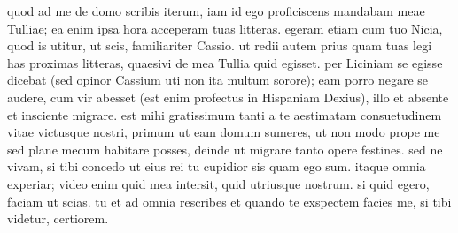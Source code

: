  quod ad me de domo scribis iterum, iam id ego proficiscens mandabam meae Tulliae; ea enim ipsa hora acceperam tuas litteras. egeram etiam cum tuo Nicia, quod is utitur, ut scis, familiariter Cassio. ut redii autem prius quam tuas legi has proximas litteras, quaesivi de mea Tullia quid egisset. per Liciniam se egisse dicebat (sed opinor Cassium uti non ita multum sorore); eam porro negare se audere, cum vir abesset (est enim profectus in Hispaniam Dexius), illo et absente et insciente migrare. est mihi gratissimum tanti a te aestimatam consuetudinem vitae victusque nostri, primum ut eam domum sumeres, ut non modo prope me sed plane mecum habitare posses, deinde ut migrare tanto opere festines. sed ne vivam, si tibi concedo ut eius rei tu cupidior sis quam ego sum. itaque omnia experiar; video enim quid mea intersit, quid utriusque nostrum. si quid egero, faciam ut scias. tu et ad omnia rescribes et quando te exspectem facies me, si tibi videtur, certiorem.
